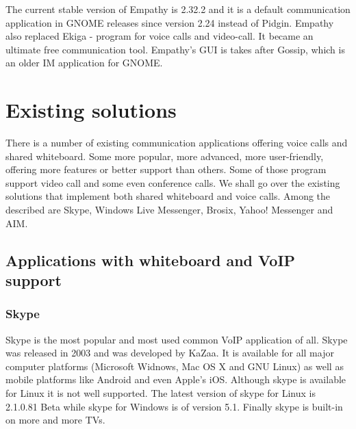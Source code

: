 The current stable version of Empathy is 2.32.2 and it is a default communication application in GNOME releases since version 2.24 instead of Pidgin. Empathy also replaced Ekiga - program for voice calls and video-call. It became an ultimate free communication tool. Empathy's GUI is takes after Gossip, which is an older IM application for GNOME. 


\chapter{Existing solutions}


There is a number of existing communication applications offering voice calls and shared whiteboard. Some more popular, more advanced, more user-friendly, offering more features or better support than others. Some of those program support video call and some even conference calls. We shall go over the existing solutions that implement both shared whiteboard and voice calls. Among the described are Skype\cite{skype}, Windows Live Messenger\cite{WindowsLiveMessenger}, Brosix\cite{brosix}, Yahoo! Messenger\cite{yahoo} and AIM\cite{AIM}.

\section{Applications with whiteboard and VoIP support}
\subsection*{Skype}
Skype is the most popular and most used common VoIP application of all. Skype was released in 2003 and was developed by KaZaa\cite{kazaa}. It is available for all major computer platforms (Microsoft Widnows, Mac OS X and GNU Linux) as well as mobile platforms like Android and even Apple's iOS. Although skype is available for Linux it is not well supported. The latest version of skype for Linux is 2.1.0.81 Beta while skype for Windows is of version 5.1. Finally skype is built-in on more and more TVs.

